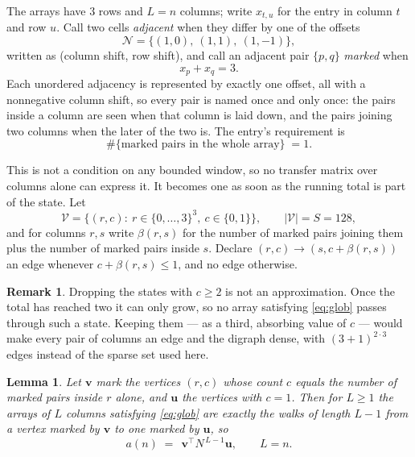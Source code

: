 \documentclass[11pt,a4paper]{article}
\theoremstyle{plain}
\newtheorem{lemma}[theorem]{Lemma}
\theoremstyle{definition}
\newtheorem{remark}[theorem]{Remark}
\begin{document}
The arrays have $3$ rows and $L=n$ columns; write $x_{t,u}$ for the entry in
column $t$ and row $u$. Call two cells \emph{adjacent} when they differ by one of the
offsets
\[
\mathcal N=\{(1,0),\ (1,1),\ (1,-1)\},
\]
written as (column shift, row shift), and call an adjacent pair $\{p,q\}$
\emph{marked} when
\[
x_{p}+x_{q}=3 .
\]
Each unordered adjacency is represented by exactly one offset, all with a nonnegative column
shift, so every pair is named once and only once: the pairs inside a column are seen when
that column is laid down, and the pairs joining two columns when the later of the two is. The
entry's requirement is
\begin{equation}\label{eq:glob}
\#\{\text{marked pairs in the whole array}\}\;=1.
\end{equation}

This is not a condition on any bounded window, so no transfer matrix over columns alone can
express it. It becomes one as soon as the running total is part of the state. Let
\[
\mathcal V=\bigl\{(r,c):\ r\in\{0,\dots,3\}^{3},\ c\in\{0,1\}\bigr\},
\qquad |\mathcal V|=S=128,
\]
and for columns $r,s$ write $\beta(r,s)$ for the number of marked pairs joining them plus the
number of marked pairs inside $s$. Declare $(r,c)\to(s,c+\beta(r,s))$ an edge whenever
$c+\beta(r,s)\le1$, and no edge otherwise.

\begin{remark}
Dropping the states with $c\ge2$ is not an approximation. Once the total has reached two it
can only grow, so no array satisfying \eqref{eq:glob} passes through such a state. Keeping
them --- as a third, absorbing value of $c$ --- would make every pair of columns an edge and
the digraph dense, with $(3+1)^{2\cdot3}$ edges instead of the sparse set used here.
\end{remark}

\begin{lemma}\label{lem:walk}
Let $\mathbf{v}$ mark the vertices $(r,c)$ whose count $c$ equals the number of marked pairs
inside $r$ alone, and $\mathbf{u}$ the vertices with $c=1$. Then for $L\ge1$ the arrays
of $L$ columns satisfying \eqref{eq:glob} are exactly the walks of length $L-1$ from a
vertex marked by $\mathbf{v}$ to one marked by $\mathbf{u}$, so
\[
a(n)\;=\;\,\mathbf{v}^{\!\top}N^{\,L-1}\mathbf{u},\qquad L=n .
\]
\end{lemma}
\end{document}
